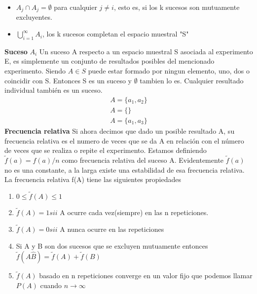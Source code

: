 \documentclass[10pt,a4paper]{article}
\begin{document}
\begin{itemize}
	\item $A_j \cap A_j = \emptyset$ para cualquier $j\neq i$, esto es, si los k sucesos son mutuamente excluyentes.
	\item $\bigcup\limits_{i=1}^{\infty} A_{i}$, los k sucesos completan el espacio muestral "S"
\end{itemize}
	\textbf{Suceso} $A_i$ Un suceso A respecto a un espacio muestral S asociada al experimento E, es simplemente un conjunto de resultados posibles del mencionado experimento. Siendo $A \in S$ puede estar formado por ningun elemento, uno, dos o coincidir con S. Entonces S es un suceso y $\emptyset$ tambien lo es. Cualquier resultado individual también es un suceso.
	\begin{align}
		A=\{a_1,a_2\}\\
		A=\{\}\\
		A=\{a_1,a_3\}
	\end{align}
	\textbf{Frecuencia relativa} Si ahora decimos que dado un posible resultado A, su frecuencia relativa es el numero de veces que se da A en relación con el número de veces que se realiza o repite el experimento. Estamos definiendo $\tilde{f}(a)=f(a)/n$ como frecuencia relativa del suceso A.
	Evidentemente $\tilde{f}(a)$ no es una constante, a la larga existe una estabilidad de esa frecuencia relativa.\\
	La frecuencia relativa f(A) tiene las siguientes propiedades
	\begin{enumerate}
		\item $0\leq \tilde{f}(A)\leq 1$
		\item $\tilde{f}(A)=1 sii$ A ocurre cada vez(siempre) en las n repeticiones.
		\item $\tilde{f}(A)=0 sii$ A nunca ocurre en las repeticiones
		\item Si A y B son dos sucesos que se excluyen mutuamente entonces $\tilde{f}(A\hat B)=\tilde{f}(A)+\tilde{f}(B)$
		\item $\tilde{f}(A)$ basado en n repeticiones converge en un valor fijo que podemos llamar $P(A)$ cuando $n\to\infty$
	\end{enumerate}
\end{document}
